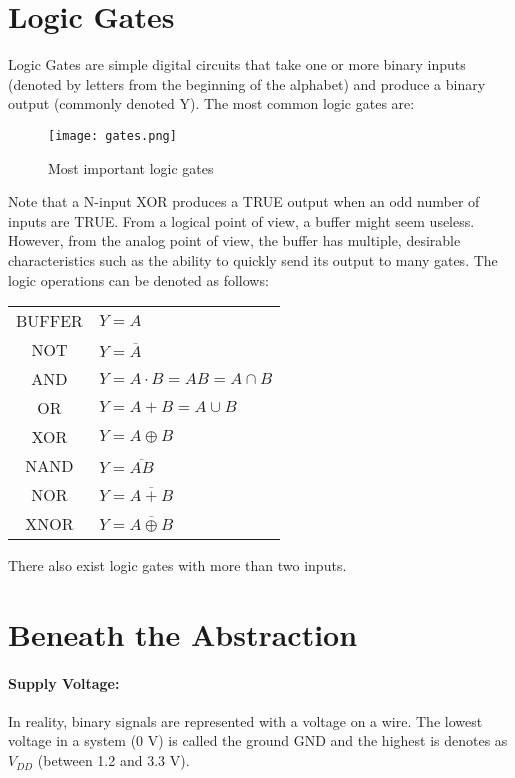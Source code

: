 \section{Logic Gates}

Logic Gates are simple digital circuits that take one or more binary inputs (denoted by letters from the beginning of the alphabet) and 
produce a binary output (commonly denoted Y). The most common logic gates are: \\

\begin{figure}[h]
    \centering
    \texttt{[image: gates.png]}
    \caption{Most important logic gates}
\end{figure}

Note that a N-input XOR produces a TRUE output when an odd number of inputs are TRUE. From a logical point of view, a buffer 
might seem useless. However, from the analog point of view, the buffer has multiple, desirable characteristics such as the 
ability to quickly send its output to many gates. The logic operations can be denoted as follows:

\begin{center}
    \begin{tabular}{ c  l }
        BUFFER & $Y = A$  \\ 
        NOT & $Y = \overline{A}$  \\ 
        AND & $Y = A \cdot B = AB = A \cap  B$  \\ 
        OR & $Y = A + B = A \cup B $  \\ 
        XOR & $Y = A \oplus B$  \\ 
        NAND & $Y = \overline{AB}$  \\   
        NOR & $Y = \overline{A + B}$ \\
        XNOR & $Y = \overline{A \oplus B}$
    \end{tabular}
\end{center}

There also exist logic gates with more than two inputs.

\section{Beneath the Abstraction}

\paragraph{Supply Voltage:} In reality, binary signals are represented with a voltage on a wire. The lowest
voltage in a system (0 V) is called the ground GND and the highest is denotes as $V_{DD}$ (between 1.2 and 3.3 V).

